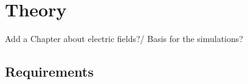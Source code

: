 \section{Theory}
	Add a Chapter about electric fields?/ Basis for the simulations?
	\subsection{Requirements}
	
